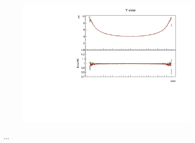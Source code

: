 \documentclass[12pt,a4paper]{article}
\begin{document}
\begin{figure}[!ht]
\begin{subfigure}{0.5\textwidth}
  \end{subfigure}
  \begin{subfigure}{0.5\textwidth}
    \includegraphics[width=\linewidth]{PlotsAngularDistribution/cm_cosx_y.pdf}
  \end{subfigure}
  \caption{...}
  \label{figAbsCalibCosX2}
\end{figure}
\end{document}
